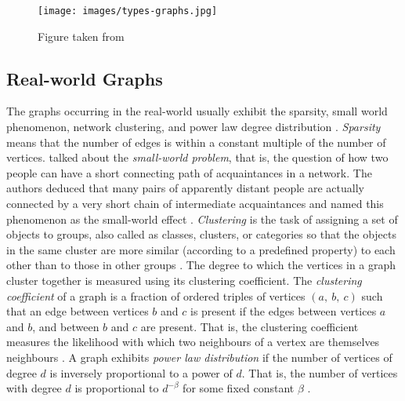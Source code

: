 \documentclass[12pt]{article}
\theoremstyle{definition}
\begin{document}
\begin{figure}
 \noindent
\centering
\texttt{[image: images/types-graphs.jpg]}
 \caption{Figure taken from \cite{Carlson20}} \label{fig1}
\end{figure}

\subsection{Real-world Graphs}

The graphs occurring in the real-world usually exhibit the sparsity, small world phenomenon, network clustering, and power law degree distribution \cite{Newman2566, yegnanarayanan2011note}. \textit{Sparsity} means that the number of edges is within a constant multiple of the number of vertices. \citep{travers1977experimental} talked about the \textit{small-world problem}, that is, the question of how two people can have a short connecting path of acquaintances in a network. The authors deduced that many pairs of apparently distant people are actually connected by a very short chain of intermediate acquaintances and named this phenomenon as the small-world effect \cite{travers1977experimental}. \textit{Clustering} is the task of assigning a set of objects to groups, also called as classes, clusters, or categories so that the objects in the same cluster are more similar (according to a predefined property) to each other than to those in other groups \cite{Newman2566}. The degree to which the vertices in a graph cluster together is measured using its clustering coefficient. The \textit{clustering coefficient} of a graph is a fraction of ordered triples of vertices $(a,\ b,\ c)$ such that an edge between vertices $b$ and $c$ is present if the edges between vertices $a$ and $b$, and between $b$ and $c$ are present. That is, the clustering coefficient measures the likelihood with which two neighbours of a vertex are themselves neighbours \cite{yegnanarayanan2011note}. A graph exhibits \textit{power law distribution} if the number of vertices of degree $d$ is inversely proportional to a power of $d$. That is, the number of vertices with degree $d$ is proportional to $d^{-\beta}$ for some fixed constant $\beta$ \cite{yegnanarayanan2011note}.
\end{document}
